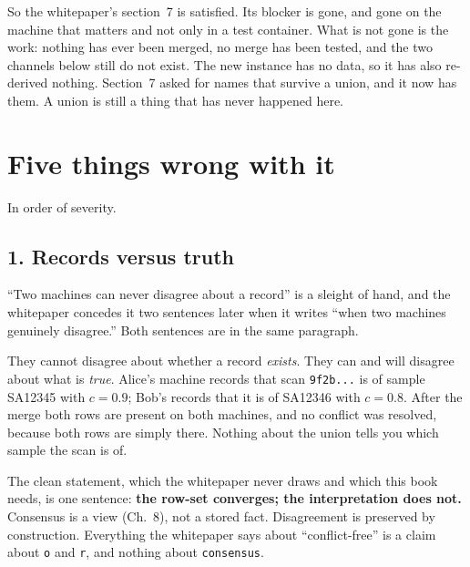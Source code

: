 So the whitepaper's section~7 is satisfied. Its blocker is gone, and gone on the machine that matters and not only in a test container. What is not gone is the work: nothing has ever been merged, no merge has been tested, and the two channels below still do not exist. The new instance has no data, so it has also re-derived nothing. Section~7 asked for names that survive a union, and it now has them. A union is still a thing that has never happened here.

\section{Five things wrong with it}

In order of severity.

\subsection{1. Records versus truth}

``Two machines can never disagree about a record'' is a sleight of hand, and the whitepaper concedes it two sentences later when it writes ``when two machines genuinely disagree.'' Both sentences are in the same paragraph.

They cannot disagree about whether a record \emph{exists}. They can and will disagree about what is \emph{true}. Alice's machine records that scan \texttt{9f2b...} is of sample SA12345 with $c = 0.9$; Bob's records that it is of SA12346 with $c = 0.8$. After the merge both rows are present on both machines, and no conflict was resolved, because both rows are simply there. Nothing about the union tells you which sample the scan is of.

The clean statement, which the whitepaper never draws and which this book needs, is one sentence: \textbf{the row-set converges; the interpretation does not.} Consensus is a view (Ch.~8), not a stored fact. Disagreement is preserved by construction. Everything the whitepaper says about ``conflict-free'' is a claim about \texttt{o} and \texttt{r}, and nothing about \texttt{consensus}.

